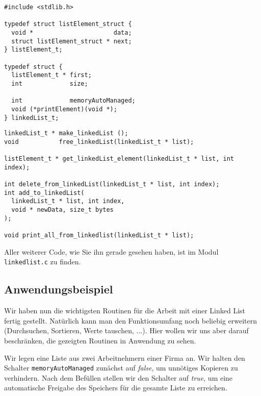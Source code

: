 \begin{codebox}
\begin{verbatim}
#include <stdlib.h>

typedef struct listElement_struct {
  void *                      data;
  struct listElement_struct * next;
} listElement_t;

typedef struct {
  listElement_t * first;
  int             size;
  
  int             memoryAutoManaged;
  void (*printElement)(void *);
} linkedList_t;
\end{verbatim}
\end{codebox}
%
\begin{codebox}[]
\begin{verbatim}
linkedList_t * make_linkedList ();
void           free_linkedList(linkedList_t * list);

listElement_t * get_linkedList_element(linkedList_t * list, int index);

int delete_from_linkedList(linkedList_t * list, int index);
int add_to_linkedList(
  linkedList_t * list, int index, 
  void * newData, size_t bytes
);

void print_all_from_linkedlist(linkedList_t * list);
\end{verbatim}
\end{codebox}

Aller weiterer Code, wie Sie ihn gerade gesehen haben, ist im Modul \texttt{linkedlist.c} zu finden.

\subsection{Anwendungsbeispiel}
Wir haben nun die wichtigsten Routinen für die Arbeit mit einer Linked List fertig gestellt. Natürlich kann man den Funktionsumfang noch beliebig erweitern (Durchsuchen, Sortieren, Werte tauschen, ...). Hier wollen wir uns aber darauf beschränken, die gezeigten Routinen in Anwendung zu sehen.

Wir legen eine Liste aus zwei Arbeitnehmern einer Firma an. Wir halten den Schalter \texttt{memoryAutoManaged} zunächst auf \emph{false}, um unnötiges Kopieren zu verhindern. Nach dem Befüllen stellen wir den Schalter auf \emph{true}, um eine automatische Freigabe des Speichers für die gesamte Liste zu erreichen.

